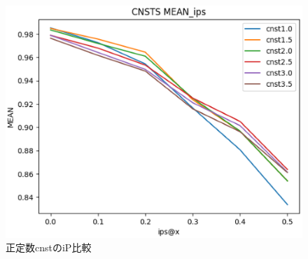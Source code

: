 \begin{figure}[H]
  \begin{center}
    \includegraphics[width=7in]{source/cnst_ip.eps}
  \vspace{1mm}
  \caption{正定数cnstのiP比較} %
  \label{fig:cnst_ip}
  \end{center} 
\end{figure}

